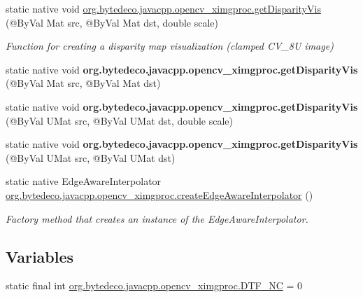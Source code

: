 \begin{DoxyCompactItemize}
\item 
static native void \hyperlink{group__ximgproc__filters_ga717daf2a9c80c6f731778cf45474ed2c}{org.\+bytedeco.\+javacpp.\+opencv\+\_\+ximgproc.\+get\+Disparity\+Vis} (@By\+Val Mat src, @By\+Val Mat dst, double scale)
\begin{DoxyCompactList}\small\item\em Function for creating a disparity map visualization (clamped C\+V\+\_\+8U image) \end{DoxyCompactList}\item 
\mbox{\label{group__ximgproc__filters_ga1acb660963956e5b95ccbb6a4719408c}} 
static native void {\bfseries org.\+bytedeco.\+javacpp.\+opencv\+\_\+ximgproc.\+get\+Disparity\+Vis} (@By\+Val Mat src, @By\+Val Mat dst)
\item 
\mbox{\label{group__ximgproc__filters_ga1704a300c0f63d28fb737310ea540af6}} 
static native void {\bfseries org.\+bytedeco.\+javacpp.\+opencv\+\_\+ximgproc.\+get\+Disparity\+Vis} (@By\+Val U\+Mat src, @By\+Val U\+Mat dst, double scale)
\item 
\mbox{\label{group__ximgproc__filters_gaaca7ad8be193bcc5cebb6a7ecb53848f}} 
static native void {\bfseries org.\+bytedeco.\+javacpp.\+opencv\+\_\+ximgproc.\+get\+Disparity\+Vis} (@By\+Val U\+Mat src, @By\+Val U\+Mat dst)
\item 
\mbox{\label{group__ximgproc__filters_ga2e4e024539c3de5affbf5c70b0baf30f}} 
static native Edge\+Aware\+Interpolator \hyperlink{group__ximgproc__filters_ga2e4e024539c3de5affbf5c70b0baf30f}{org.\+bytedeco.\+javacpp.\+opencv\+\_\+ximgproc.\+create\+Edge\+Aware\+Interpolator} ()
\begin{DoxyCompactList}\small\item\em Factory method that creates an instance of the Edge\+Aware\+Interpolator. \end{DoxyCompactList}\end{DoxyCompactItemize}
\subsection*{Variables}
\begin{DoxyCompactItemize}
\item 
static final int \hyperlink{group__ximgproc__filters_ga23e2b57a77b596c717a878099310808e}{org.\+bytedeco.\+javacpp.\+opencv\+\_\+ximgproc.\+D\+T\+F\+\_\+\+NC} = 0
\end{DoxyCompactItemize}


